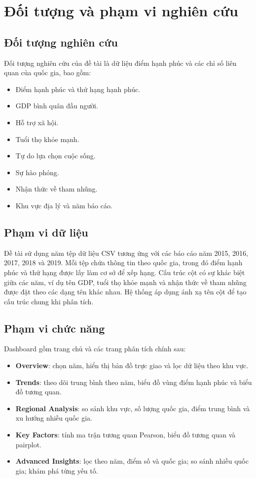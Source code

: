 \section{Đối tượng và phạm vi nghiên cứu}

\subsection{Đối tượng nghiên cứu}

Đối tượng nghiên cứu của đề tài là dữ liệu điểm hạnh phúc và các chỉ số liên quan của quốc gia, bao gồm:

\begin{itemize}
    \item Điểm hạnh phúc và thứ hạng hạnh phúc.
    \item GDP bình quân đầu người.
    \item Hỗ trợ xã hội.
    \item Tuổi thọ khỏe mạnh.
    \item Tự do lựa chọn cuộc sống.
    \item Sự hào phóng.
    \item Nhận thức về tham nhũng.
    \item Khu vực địa lý và năm báo cáo.
\end{itemize}

\subsection{Phạm vi dữ liệu}

Đề tài sử dụng năm tệp dữ liệu CSV tương ứng với các báo cáo năm 2015, 2016, 2017, 2018 và 2019. Mỗi tệp chứa thông tin theo quốc gia, trong đó điểm hạnh phúc và thứ hạng được lấy làm cơ sở để xếp hạng. Cấu trúc cột có sự khác biệt giữa các năm, ví dụ tên GDP, tuổi thọ khỏe mạnh và nhận thức về tham nhũng được đặt theo các dạng tên khác nhau. Hệ thống áp dụng ánh xạ tên cột để tạo cấu trúc chung khi phân tích.

\subsection{Phạm vi chức năng}

Dashboard gồm trang chủ và các trang phân tích chính sau:

\begin{itemize}
    \item \textbf{Overview}: chọn năm, hiển thị bản đồ trực giao và lọc dữ liệu theo khu vực.
    \item \textbf{Trends}: theo dõi trung bình theo năm, biểu đồ vùng điểm hạnh phúc và biểu đồ tương quan.
    \item \textbf{Regional Analysis}: so sánh khu vực, số lượng quốc gia, điểm trung bình và xu hướng nhiều quốc gia.
    \item \textbf{Key Factors}: tính ma trận tương quan Pearson, biểu đồ tương quan và pairplot.
    \item \textbf{Advanced Insights}: lọc theo năm, điểm số và quốc gia; so sánh nhiều quốc gia; khám phá từng yếu tố.
\end{itemize}

